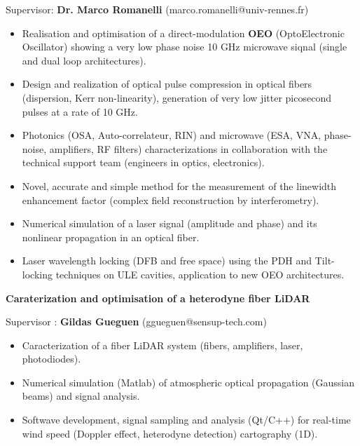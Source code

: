 \documentclass[9pt,a4paper,academicons]{altacv}
\begin{document}
Supervisor: \textbf{Dr. Marco Romanelli} (marco.romanelli@univ-rennes.fr)
\smallskip
\small{
  \begin{itemize}
    \item Realisation and optimisation of a direct-modulation \textbf{OEO} (OptoElectronic Oscillator) showing a very low phase noise 10 GHz microwave siqnal (single and dual loop architectures).

    \item Design and realization of optical pulse compression in optical fibers (dispersion, Kerr non-linearity), generation of very low jitter picosecond pulses at a rate of 10 GHz.
    \item Photonics (OSA, Auto-correlateur, RIN) and microwave (ESA, VNA, phase-noise, amplifiers, RF filters) characterizations in collaboration with the technical support team (engineers in optics, electronics).
    \item Novel, accurate and simple method for the measurement of the linewidth enhancement factor (complex field reconstruction by interferometry).
    \item Numerical simulation of a laser signal (amplitude and phase) and its nonlinear propagation in an optical fiber.
    \item Laser wavelength locking (DFB and free space) using the PDH and Tilt-locking techniques on ULE cavities, application to new OEO architectures.
  \end{itemize}
}

\divider


\textbf{Caraterization and optimisation of a heterodyne fiber LiDAR}\smallskip

Supervisor : \textbf{Gildas Gueguen} (ggueguen@sensup-tech.com)
\smallskip
\small{
  \begin{itemize}
    \item Caracterization of a fiber LiDAR system (fibers, amplifiers, laser, photodiodes).
    \item Numerical simulation (Matlab) of atmospheric optical propagation (Gaussian beams) and signal analysis.
    \item Softwave development, signal sampling and analysis (Qt/C++) for real-time wind speed (Doppler effect, heterodyne detection) cartography (1D).
  \end{itemize}
}

\divider
\end{document}
